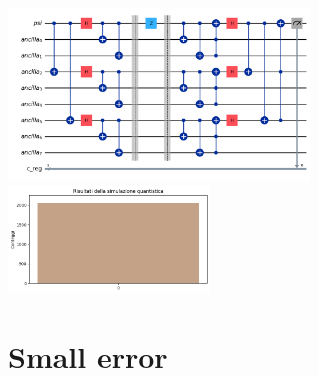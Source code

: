 \documentclass[12pt, a4paper]{article}
\begin{document}
\begin{center} 
        \includegraphics[width=0.6\textwidth]{img/circuitPhaseflip.png} 
        \includegraphics[width=0.4\textwidth]{img/resultsSuccessPhaseflip.png}
\end{center}

\section*{Small error}
\end{document}
